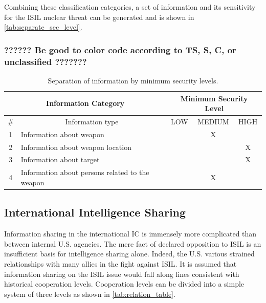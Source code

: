 \documentclass{report}
\begin{document}
Combining these classification categories, a set of information and its sensitivity for the ISIL nuclear threat can be generated and is shown in \autoref{tab:separate_sec_level}.  

\subsubsection{?????? Be good to color code according to TS, S, C, or unclassified ???????}

\begin{table}[h]
\centering
\begin{tabular}{|c|l|c|c|c|}
\hline
\multicolumn{2}{|c|}{Information Category}           & \multicolumn{3}{c|}{Minimum Security Level}                                                 \\ \hline
\# & \multicolumn{1}{c|}{Information type}           & \cellcolor[HTML]{34FF34}LOW & \cellcolor[HTML]{FCFF2F}MEDIUM & \cellcolor[HTML]{FE0000}HIGH \\ \hline
1  & Information about weapon                        & \cellcolor[HTML]{34FF34}    & \cellcolor[HTML]{FCFF2F}X      & \cellcolor[HTML]{FE0000}     \\ \hline
2  & Information about weapon location               & \cellcolor[HTML]{34FF34}    & \cellcolor[HTML]{FCFF2F}       & \cellcolor[HTML]{FE0000}X    \\ \hline
3  & Information about target                        & \cellcolor[HTML]{34FF34}    & \cellcolor[HTML]{FCFF2F}       & \cellcolor[HTML]{FE0000}X    \\ \hline
4  & Information about persons related to the weapon & \cellcolor[HTML]{34FF34}    & \cellcolor[HTML]{FCFF2F}X      & \cellcolor[HTML]{FE0000}     \\ \hline
\end{tabular}
\caption{Separation of information by minimum security levels.}
\label{tab:separate_sec_level}
\end{table}

\subsection{International Intelligence Sharing}

Information sharing in the international IC is immensely more complicated than between internal U.S. agencies. The mere fact of declared opposition to ISIL is an insufficient basis for intelligence sharing alone.  Indeed, the U.S. various strained relationships with many allies in the fight against ISIL. It is assumed that information sharing on the ISIL issue would fall along lines consistent with historical cooperation levels. Cooperation levels can be divided into a simple system of three levels as shown in \autoref{tab:relation_table}.
\end{document}
